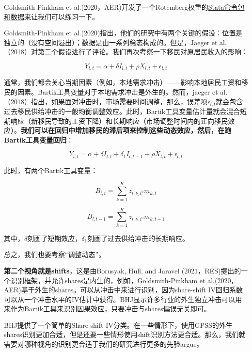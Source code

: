 \documentclass[cn,12pt,math=newtx,citestyle=gb7714-2015,bibstyle=gb7714-2015]{elegantbook}
\begin{document}
	Goldsmith-Pinkham et al.(2020，AER)开发了一个Rotemberg权重的\href{https://github.com/paulgp/bartik-weight}{Stata命令包和数据}来让我们可以练习一下。
	
	Goldsmith-Pinkham et al.(2020)指出，他们的研究中有两个关键的假设：位置是独立的（没有空间溢出）；数据是由一系列稳态构成的。但是，Jaeger et al.（2018）对第二个假设进行了评论。我们再次考察一下移民对原居民收入的影响：
	
		\begin{equation}
		Y_{l,t} = \alpha + \delta I_{l,t} +\rho X_{l,t} + \epsilon_{l,t}
	\end{equation}

    通常，我们都会关心当期因素（例如，本地需求冲击）——影响本地居民工资和移民的因素。Bartik工具变量对于本地需求冲击是外生的。然而，jaeger et al.（2018）指出，如果面对冲击时，市场需要时间调整，那么，误差项$\epsilon_{l,t}$就会包含过去移民供给冲击的一般均衡调整效应。此时，Bartik工具变量估计量就会混合短期响应（新移民导致的工资下降）和长期响应（市场调整时间内的正向移民效应）。\textbf{我们可以在回归中增加移民的滞后项来控制这些动态效应，然后，在跑Bartik工具变量回归}：
    
    	\begin{equation}
    	Y_{l,t} = \alpha + \delta I_{l,t} + \delta_1 I_{l,t-1} +\rho X_{l,t} + \epsilon_{l,t}
    \end{equation}
	
	此时，有两个Bartik工具变量：
	
		\begin{equation}
		B_{l,t} = \sum_{k=1}^{K} z_{l,k,t^0} m_{k,t}
	\end{equation}

	\begin{equation}
	B_{l,t-1} = \sum_{k=1}^{K} z_{l,k,t^0} m_{k,t-1}
\end{equation}
	
	其中，$\delta$刻画了短期效应，$\delta_1$刻画了过去供给冲击的长期响应。
	
	总之，我们也要考察“调整动态”。
	
	
	\textbf{第二个视角就是shifts}，这是由Borusyak, Hull, and Jaravel (2021，RES)提出的一个识别框架，并允许shares是内生的，例如，Goldsmith-Pinkham et al.(2020，AER)基于外生的shares。可以从冲击中来进行识别，因为share-shift IV回归系数可以从一个冲击水平的IV估计中获得。BHJ显示许多行业的外生独立冲击可以用来作为Bartik工具来识别因果效应，只要冲击与shares偏误无关即可。
	
	BHJ提供了一个简单的Share-shift IV分类。在一些情形下，使用GPSS的外生shares识别更加合适，但是还要一些情形使用shift识别方法更合适。那么，我们就需要对哪种视角的识别更合适于我们的研究进行更多的先验argue。
	
\end{document}
